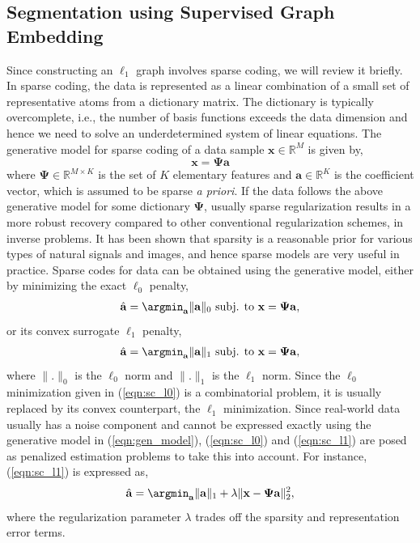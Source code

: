 \subsection{Segmentation using Supervised Graph Embedding}
\label{sec:l1graph}
Since constructing an $\ell_1$ graph involves sparse coding, we will review it briefly. In sparse coding, the data is represented as a linear combination of a small set of representative atoms from a dictionary matrix. The dictionary is typically overcomplete, i.e., the number of basis functions exceeds the data dimension and hence we need to solve an underdetermined system of linear equations. The generative model for sparse coding of a data sample $\mathbf{x} \in \mathbb{R}^M$ is given by,
\begin{equation}
\label{eqn:gen_model}
\mathbf{x} = \mathbf{\Psi}\mathbf{a}
\end{equation} where $\mathbf{\Psi} \in \mathbb{R}^{M \times K}$ is the set of $K$ elementary features and $\mathbf{a} \in \mathbb{R}^K$ is the coefficient vector, which is assumed to be sparse \textit{a priori}. If the data follows the above generative model for some dictionary $\mathbf{\Psi}$, usually sparse regularization results in a more robust recovery compared to other conventional regularization schemes, in inverse problems. It has been shown that sparsity is a reasonable prior for various types of natural signals and images, and hence sparse models are very useful in practice. Sparse codes for data can be obtained using the generative model, either by minimizing the exact $\ell_0$ penalty,
\begin{eqnarray}
\hat{\mathbf{a}} = \argmin_\mathbf{a} \|\mathbf{a}\|_0 \text{ subj. to } \mathbf{x} = \boldsymbol{\Psi}\mathbf{a},
\label{eqn:sc_l0}
\end{eqnarray} or its convex surrogate $\ell_1$ penalty,
\begin{eqnarray}
\hat{\mathbf{a}} = \argmin_\mathbf{a} \|\mathbf{a}\|_1 \text{ subj. to } \mathbf{x} = \boldsymbol{\Psi}\mathbf{a},
\label{eqn:sc_l1}
\end{eqnarray}
where $\|.\|_0$ is the $\ell_0$ norm and $\|.\|_1$ is the $\ell_1$ norm. Since the $\ell_0$ minimization given in (\ref{eqn:sc_l0}) is a combinatorial problem, it is usually replaced by its convex counterpart, the $\ell_1$ minimization.  Since real-world data usually has a noise component and cannot be expressed exactly using the generative model in (\ref{eqn:gen_model}), (\ref{eqn:sc_l0}) and (\ref{eqn:sc_l1}) are posed as penalized estimation problems to take this into account. For instance, (\ref{eqn:sc_l1}) is expressed as,
\begin{eqnarray}
\hat{\mathbf{a}} = \argmin_\mathbf{a} \|\mathbf{a}\|_1 + \lambda \|\mathbf{x} - \boldsymbol{\Psi}\mathbf{a}\|_2^2,
\label{eqn:sc_l1_pen}
\end{eqnarray} where the regularization parameter $\lambda$ trades off the sparsity and representation error terms.

